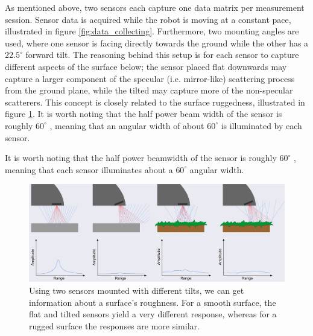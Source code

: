 As mentioned above, two sensors each capture one data matrix per measurement session. Sensor data is acquired while the robot is moving at a constant pace, illustrated in figure \ref{fig:data_collecting}. Furthermore, two mounting angles are used, where one sensor is facing directly towards the ground while the other has a $22.5^\circ$ forward tilt. The reasoning behind this setup is for each sensor to capture different aspects of the surface below; the sensor placed flat downwards may capture a larger component of the specular (i.e. mirror-like) scattering process from the ground plane, while the tilted may capture more of the non-specular scatterers. This concept is closely related to the surface ruggedness, illustrated in figure \ref{fig:reflections}. It is worth noting that the half power beam width of the sensor is roughly $60^\circ$ \citep{acconeer_datasheet_a111}, meaning that an angular width of about $60^\circ$ is illuminated by each sensor.

It is worth noting that the half power beamwidth of the sensor is roughly $60^\circ$ \citep{acconeer_datasheet_a111}, meaning that each sensor illuminates about a $60^\circ$ angular width. %
\begin{figure}[h]
	\centering
	\includegraphics[scale=0.9]{figs_temp/reflections.jpg}
	\caption{Using two sensors mounted with different tilts, we can get information about a surface's roughness. For a smooth surface, the flat and tilted sensors yield a very different response, whereas for a rugged surface the responses are more similar.}
	\label{fig:reflections}
\end{figure}

